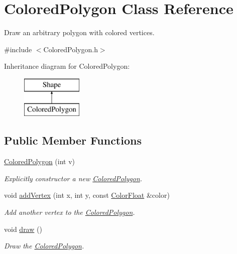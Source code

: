 \hypertarget{class_colored_polygon}{\section{Colored\+Polygon Class Reference}
\label{class_colored_polygon}
}


Draw an arbitrary polygon with colored vertices.  




{\ttfamily \#include $<$Colored\+Polygon.\+h$>$}

Inheritance diagram for Colored\+Polygon\+:\begin{figure}[H]
\begin{center}
\leavevmode
\includegraphics[height=2.000000cm]{class_colored_polygon}
\end{center}
\end{figure}
\subsection*{Public Member Functions}
\begin{DoxyCompactItemize}
\item 
\hyperlink{class_colored_polygon_aa532110241b18425555fed1dc18937c0}{Colored\+Polygon} (int v)
\begin{DoxyCompactList}\small\item\em Explicitly constructor a new \hyperlink{class_colored_polygon}{Colored\+Polygon}. \end{DoxyCompactList}\item 
void \hyperlink{class_colored_polygon_ab0791f2c340d92ac452fdd96aa0fcde0}{add\+Vertex} (int x, int y, const \hyperlink{struct_color_float}{Color\+Float} \&color)
\begin{DoxyCompactList}\small\item\em Add another vertex to the \hyperlink{class_colored_polygon}{Colored\+Polygon}. \end{DoxyCompactList}\item 
void \hyperlink{class_colored_polygon_a543a3233225455e9288b0b98735fab42}{draw} ()
\begin{DoxyCompactList}\small\item\em Draw the \hyperlink{class_colored_polygon}{Colored\+Polygon}. \end{DoxyCompactList}\end{DoxyCompactItemize}

